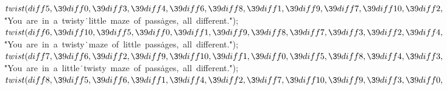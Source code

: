 ${}\\{twist}(\\{diff5},\39\\{diff0},\39\\{diff3},\39\\{diff4},\39\\{diff6},\39%
\\{diff8},\39\\{diff1},\39\\{diff9},\39\\{diff7},\39\\{diff10},\39\\{diff2},{}$%
\6
\.{"You\ are\ in\ a\ twisty}\)\.{\ little\ maze\ of\ pass}\)\.{ages,\ all\
different.}\)\.{"});\6
${}\\{twist}(\\{diff6},\39\\{diff10},\39\\{diff5},\39\\{diff0},\39\\{diff1},\39%
\\{diff9},\39\\{diff8},\39\\{diff7},\39\\{diff3},\39\\{diff2},\39\\{diff4},{}$\6
\.{"You\ are\ in\ a\ twisty}\)\.{\ maze\ of\ little\ pass}\)\.{ages,\ all\
different.}\)\.{"});\6
${}\\{twist}(\\{diff7},\39\\{diff6},\39\\{diff2},\39\\{diff9},\39\\{diff10},\39%
\\{diff1},\39\\{diff0},\39\\{diff5},\39\\{diff8},\39\\{diff4},\39\\{diff3},{}$\6
\.{"You\ are\ in\ a\ little}\)\.{\ twisty\ maze\ of\ pass}\)\.{ages,\ all\
different.}\)\.{"});\6
${}\\{twist}(\\{diff8},\39\\{diff5},\39\\{diff6},\39\\{diff1},\39\\{diff4},\39%
\\{diff2},\39\\{diff7},\39\\{diff10},\39\\{diff9},\39\\{diff3},\39\\{diff0},{}$%

